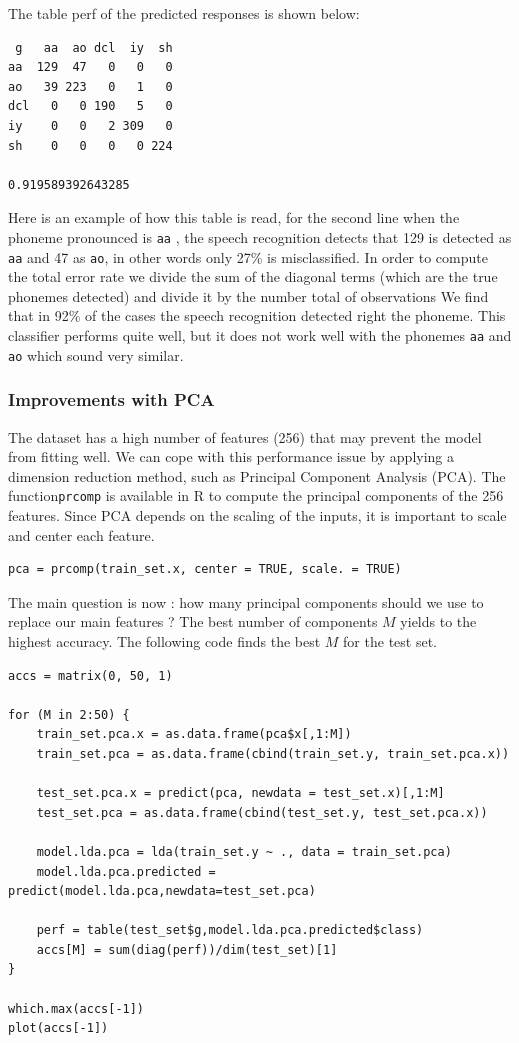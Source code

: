 \documentclass[]{report}
\begin{document}
The table perf of the predicted responses is shown below:
\begin{center}
\begin{verbatim}
 g 	 aa  ao dcl  iy  sh
aa  129  47   0   0   0
ao   39 223   0   1   0
dcl   0   0 190   5   0
iy    0   0   2 309   0
sh    0   0   0   0 224

0.919589392643285
\end{verbatim}
\end{center}

Here is an example of how this table is read, for the second line
when the phoneme pronounced is \texttt{aa} , the speech recognition detects that 129 is detected as \texttt{aa} and 47 as \texttt{ao}, in other words only 27\% is misclassified.
In order to compute the total error rate we divide the sum of the diagonal terms (which are the true phonemes detected) and divide it by the number total of observations We find that in 92\% of the cases the speech recognition detected right the phoneme. This classifier performs quite well, but it does not work well with the phonemes \texttt{aa} and \texttt{ao} which sound very similar.

\subsubsection{Improvements with PCA}
The dataset has a high number of features (256) that may prevent the model from fitting well. We can cope with this performance issue by applying a dimension reduction method, such as Principal Component Analysis (PCA). The function\texttt{prcomp} is available in R to compute the principal components of the 256 features. Since PCA depends on the scaling of the inputs, it is important to scale and center each feature.
\begin{lstlisting}
pca = prcomp(train_set.x, center = TRUE, scale. = TRUE)
\end{lstlisting}

The main question is now : how many principal components should we use to replace our main features ? The best number of components $M$ yields to the highest accuracy. The following code finds the best $M$ for the test set.

\begin{lstlisting}
accs = matrix(0, 50, 1)

for (M in 2:50) {
	train_set.pca.x = as.data.frame(pca$x[,1:M])
	train_set.pca = as.data.frame(cbind(train_set.y, train_set.pca.x))
	
	test_set.pca.x = predict(pca, newdata = test_set.x)[,1:M]
	test_set.pca = as.data.frame(cbind(test_set.y, test_set.pca.x))
	
	model.lda.pca = lda(train_set.y ~ ., data = train_set.pca)
	model.lda.pca.predicted = predict(model.lda.pca,newdata=test_set.pca)
	
	perf = table(test_set$g,model.lda.pca.predicted$class)
	accs[M] = sum(diag(perf))/dim(test_set)[1]
}

which.max(accs[-1])
plot(accs[-1])
\end{lstlisting}
\end{document}
